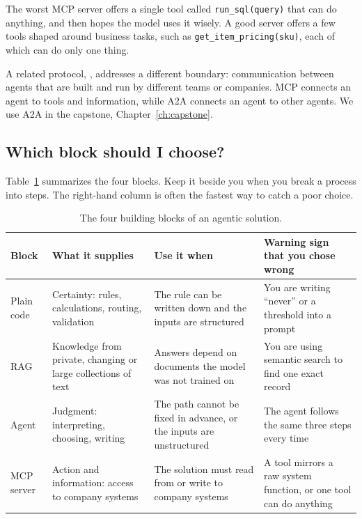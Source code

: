 \begin{watchout}
The worst MCP server offers a single tool called \texttt{run\_sql(query)} that can do anything, and then hopes the model uses it wisely. A good server offers a few tools shaped around business tasks, such as \texttt{get\_item\_pricing(sku)}, each of which can do only one thing.
\end{watchout}

A related protocol, , addresses a different boundary: communication between agents that are built and run by different teams or companies. MCP connects an agent to tools and information, while A2A connects an agent to other agents. We use A2A in the capstone, Chapter~\ref{ch:capstone}.

\subsection{Which block should I choose?}

Table~\ref{tab:blocks} summarizes the four blocks. Keep it beside you when you break a process into steps. The right-hand column is often the fastest way to catch a poor choice.

\begin{table}[htbp]
\centering
\small
\caption{The four building blocks of an agentic solution.}
\label{tab:blocks}
\begin{tabularx}{\textwidth}{@{}>{\raggedright\arraybackslash}p{2.1cm}>{\raggedright\arraybackslash}X>{\raggedright\arraybackslash}X>{\raggedright\arraybackslash}X@{}}
\toprule
Block & What it supplies & Use it when & Warning sign that you chose wrong \\
\midrule
\cellcolor{codefill}Plain code & Certainty: rules, calculations, routing, validation & The rule can be written down and the inputs are structured & You are writing ``never'' or a threshold into a prompt \\
\cellcolor{ragfill}RAG & Knowledge from private, changing or large collections of text & Answers depend on documents the model was not trained on & You are using semantic search to find one exact record \\
\cellcolor{agentfill}Agent & Judgment: interpreting, choosing, writing & The path cannot be fixed in advance, or the inputs are unstructured & The agent follows the same three steps every time \\
\cellcolor{mcpfill}MCP server & Action and information: access to company systems & The solution must read from or write to company systems & A tool mirrors a raw system function, or one tool can do anything \\
\bottomrule
\end{tabularx}
\end{table}

